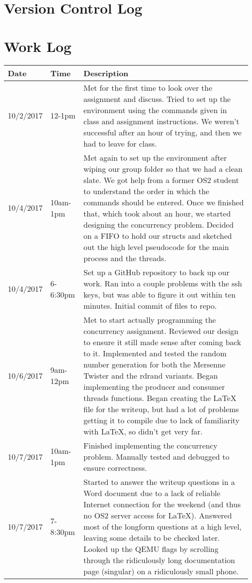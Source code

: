 \documentclass[letterpaper,10pt,titlepage]{article}
\begin{document}
\section{Version Control Log} 




\section{Work Log}

\begin{tabular}{ |p{2.5cm}|p{2.5cm}|p{9cm}| } 
   \hline
   Date & Time & Description \\
   \hline
   10/2/2017 & 12-1pm & Met for the first time to look over the assignment and discuss. Tried to set up the environment using the commands given in class and assignment instructions. We weren't successful after an hour of trying, and then we had to leave for class.\\
   \hline
   10/4/2017 & 10am-1pm & Met again to set up the environment after wiping our group folder so that we had a clean slate. We got help from a former OS2 student to understand the order in which the commands should be entered. Once we finished that, which took about an hour, we started designing the concurrency problem. Decided on a FIFO to hold our structs and sketched out the high level pseudocode for the main process and the threads.\\
   \hline
   10/4/2017 & 6-6:30pm & Set up a GitHub repository to back up our work. Ran into a couple problems with the ssh keys, but was able to figure it out within ten minutes. Initial commit of files to repo.\\
   \hline
   10/6/2017 & 9am-12pm & Met to start actually programming the concurrency assignment. Reviewed our design to ensure it still made sense after coming back to it. Implemented and tested the random number generation for both the Mersenne Twister and the rdrand variants. Began implementing the producer and consumer threads functions. Began creating the LaTeX file for the writeup, but had a lot of problems getting it to compile due to lack of familiarity with LaTeX, so didn't get very far.\\
   \hline
   10/7/2017 & 10am-1pm & Finished implementing the concurrency problem. Manually tested and debugged to ensure correctness.\\
   \hline
   10/7/2017 & 7-8:30pm & Started to answer the writeup questions in a Word document due to a lack of reliable Internet connection for the weekend (and thus no OS2 server access for LaTeX). Answered most of the longform questions at a high level, leaving some details to be checked later. Looked up the QEMU flags by scrolling through the ridiculously long documentation page (singular) on a ridiculously small phone.\\

\end{tabular}
\end{document}
